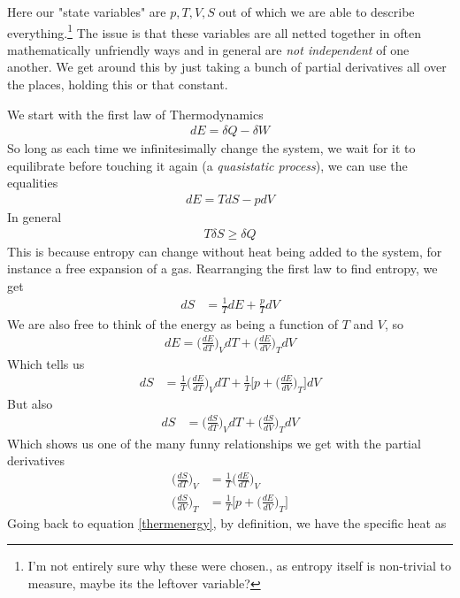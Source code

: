 Here our "state variables" are $p,T,V,S$ out of which we are able to describe everything.\footnote{I'm not entirely sure why these were chosen., as entropy itself is non-trivial to measure, maybe its the leftover variable?} The issue is that these variables  are all netted together in often mathematically unfriendly ways and in general are \emph{not independent} of one another. We get around this by just taking a bunch of partial derivatives all over the places, holding this or that constant.

We start with the first law of Thermodynamics
\begin{align}
dE = \delta Q - \delta W
\end{align}
So long as each time we infinitesimally change the system, we wait for it to equilibrate before touching it again (a \emph{quasistatic process}),  we can use the equalities
\begin{align}
dE = TdS - p dV
\end{align}
In general
\begin{align}
T\delta S \ge \delta Q
\end{align}
This is because entropy can change without heat being added to the system, for instance a free expansion of a gas. Rearranging the first law to find entropy, we get
\begin{align}
dS &= \frac{1}{T}dE +\frac{p}{T}dV
\end{align}
We are also free to think of the energy as being a function of $T$ and $V$, so
\begin{align}\label{thermenergy}
dE = \Big(\frac{dE}{dT}\Big)_VdT + \Big(\frac{dE}{dV}\Big)_TdV
\end{align}
Which tells us
\begin{align}
dS &= \frac{1}{T}\Big(\frac{dE}{dT}\Big)_VdT + \frac{1}{T}\Big[p + \Big(\frac{dE}{dV}\Big)_T\Big]dV
\end{align}
But also
\begin{align}
dS &= \Big(\frac{dS}{dT}\Big)_V dT + \Big(\frac{dS}{dV}\Big)_T dV
\end{align}
Which shows us one of the many funny relationships we get with the partial derivatives
\begin{align}
 \Big(\frac{dS}{dT}\Big)_V &= \frac{1}{T}\Big(\frac{dE}{dT}\Big)_V\\
\Big(\frac{dS}{dV}\Big)_T &= \frac{1}{T}\Big[p + \Big(\frac{dE}{dV}\Big)_T\Big]\label{partialentropy}
\end{align}
Going back to equation \ref{thermenergy}, by definition, we have the specific heat as
